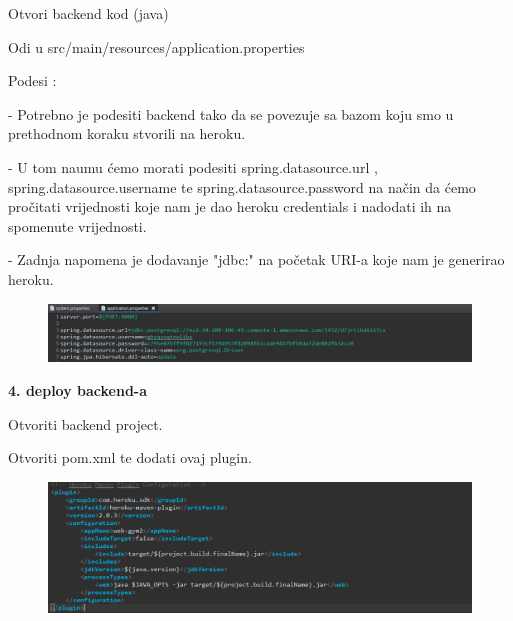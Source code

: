 \begin{packed_item}
\begin{packed_enum}
							\item Otvori backend kod (java)
							
							\item Odi u src/main/resources/application.properties
							
							\item Podesi :
							    
							       - Potrebno je podesiti backend tako da se povezuje sa bazom koju smo u prethodnom koraku stvorili na heroku.
							       
							       - U tom naumu ćemo morati podesiti spring.datasource.url , spring.datasource.username te spring.datasource.password na način da ćemo pročitati vrijednosti koje nam je dao heroku credentials i nadodati ih na spomenute vrijednosti.
							       
							       - Zadnja napomena je dodavanje "jdbc:" na početak URI-a koje nam je generirao heroku.
						
							    \begin{figure}[H]
                        			\hspace*{-1.5cm}
                        			\includegraphics[scale=0.5]{slike/java.PNG} %
                        			\centering
                        			\label{fig:promjene}
                        		\end{figure}

						\end{packed_enum}
						
						\item  \textbf{4. deploy backend-a}
						\item[] \begin{packed_enum}
	
							\item Otvoriti backend project.
							
							\item Otvoriti pom.xml te dodati ovaj plugin.
			
							    \begin{figure}[H]
                        			\hspace*{-1.5cm}
                        			\includegraphics[scale=0.5]{slike/plugin.PNG} %
                        			\centering
                        			\label{fig:promjene}
                        		\end{figure}
                        		

\end{packed_enum}
\end{packed_item}
